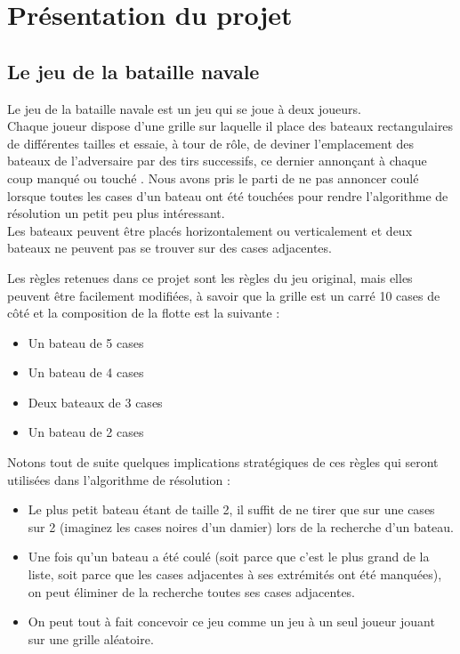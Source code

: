 \chapter{Présentation du projet}

\section{Le jeu de la bataille navale}
Le jeu de la bataille navale est un jeu qui se joue à deux joueurs.\\
Chaque joueur dispose d'une grille sur laquelle il place des bateaux rectangulaires de différentes tailles et essaie, à tour de rôle, de deviner l'emplacement des bateaux de l'adversaire par des tirs successifs, ce dernier annonçant à chaque coup \og manqué \fg{} ou \og touché \fg{}. Nous avons pris le parti de ne pas annoncer \og coulé \fg{} lorsque toutes les cases d'un bateau ont été touchées pour rendre l'algorithme de résolution un petit peu plus intéressant.\\
Les bateaux peuvent être placés horizontalement ou verticalement et deux bateaux ne peuvent pas se trouver sur des cases adjacentes.

Les règles retenues dans ce projet sont les règles du jeu original, mais elles peuvent être facilement modifiées, à savoir que la grille est un carré 10 cases de côté et la composition de la flotte est la suivante :
\begin{itemize}
\item Un bateau de 5 cases
\item Un bateau de 4 cases
\item Deux bateaux de 3 cases
\item Un bateau de 2 cases
\end{itemize}

\medskip

Notons tout de suite quelques implications stratégiques de ces règles qui seront utilisées dans l'algorithme de résolution :
\begin{itemize}
\item Le plus petit bateau étant de taille 2, il suffit de ne tirer que sur une cases sur 2 (imaginez les cases noires d'un damier) lors de la recherche d'un bateau.
\item Une fois qu'un bateau a été coulé (soit parce que c'est le plus grand de la liste, soit parce que les cases adjacentes à ses extrémités ont été manquées), on peut éliminer de la recherche toutes ses cases adjacentes.
\item On peut tout à fait concevoir ce jeu comme un jeu à un seul joueur jouant sur une grille aléatoire.
\end{itemize}

